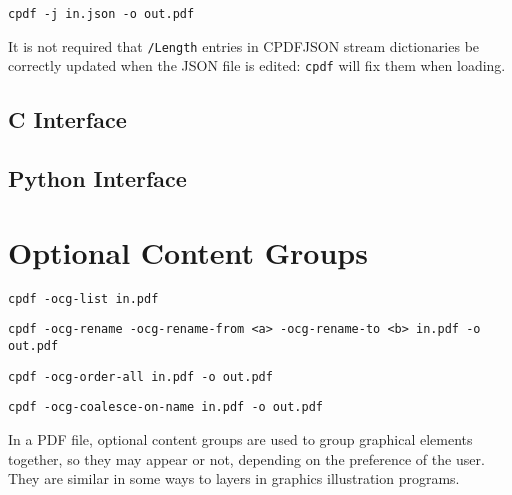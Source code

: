 \documentclass{book}
\begin{document}
  \begin{framed}
  \small\noindent\verb!cpdf -j in.json -o out.pdf!
  \end{framed}

It is not required that \texttt{/Length} entries in CPDFJSON stream dictionaries be correctly updated when the JSON file is edited: \texttt{cpdf} will fix them when loading.

\begin{cpdflib}
\clearpage
\section*{C Interface}
\begin{small}\tt

\end{small}
\end{cpdflib}

\begin{pycpdflib}
\clearpage
\section*{Python Interface}
\begin{small}\tt

\end{small}
\end{pycpdflib}

\clearpage\pagestyle{empty}
\chapter{Optional Content Groups}\label{chap:16}\pagestyle{fancy}

  {\small\begin{framed}
  \noindent\verb!cpdf -ocg-list in.pdf!

  \vspace{1.5mm}
  \noindent\verb!cpdf -ocg-rename -ocg-rename-from <a> -ocg-rename-to <b> in.pdf -o out.pdf!

  \vspace{1.5mm}
  \noindent\verb!cpdf -ocg-order-all in.pdf -o out.pdf!

  \vspace{1.5mm}
  \noindent\verb!cpdf -ocg-coalesce-on-name in.pdf -o out.pdf!

  \end{framed}}


In a PDF file, optional content groups are used to group graphical elements together, so they may appear or not, depending on the preference of the user. They are similar in some ways to layers in graphics illustration programs.
\end{document}
